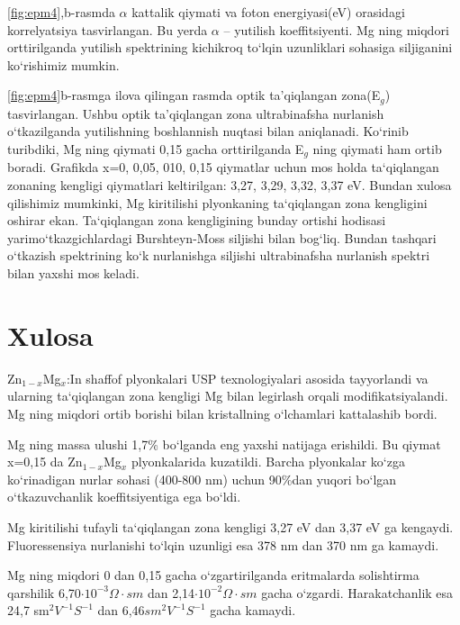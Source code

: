 \documentclass[14pt]{article}
\begin{document}
\ref{fig:epm4},b-rasmda $\alpha$ kattalik qiymati va foton energiyasi(eV) orasidagi korrelyatsiya tasvirlangan. Bu yerda $\alpha$ -- yutilish koeffitsiyenti. Mg ning miqdori orttirilganda yutilish spektrining kichikroq to`lqin uzunliklari sohasiga siljiganini ko`rishimiz mumkin.  

\ref{fig:epm4}b-rasmga ilova qilingan rasmda optik ta'qiqlangan zona(E$_{g}$) tasvirlangan. Ushbu optik ta'qiqlangan zona ultrabinafsha nurlanish o`tkazilganda yutilishning boshlannish nuqtasi bilan aniqlanadi. Ko`rinib turibdiki, Mg ning qiymati 0,15 gacha orttirilganda E$_{g}$ ning qiymati ham ortib boradi. Grafikda x=0, 0,05, 010, 0,15 qiymatlar uchun mos holda ta`qiqlangan zonaning kengligi qiymatlari keltirilgan: 3,27, 3,29, 3,32, 3,37 eV. Bundan xulosa qilishimiz mumkinki, Mg kiritilishi plyonkaning ta`qiqlangan zona kengligini oshirar ekan. Ta`qiqlangan zona kengligining bunday ortishi hodisasi yarimo`tkazgichlardagi  Burshteyn-Moss siljishi bilan bog`liq. Bundan tashqari o`tkazish spektrining ko`k nurlanishga siljishi ultrabinafsha nurlanish spektri bilan yaxshi mos keladi. 
	
	
	
	
	
	
	
	
	
	
	
	\newpage
	\section{Xulosa}
	\noindent	
	Zn$_{1-x}$Mg$_{x}$:In shaffof plyonkalari USP texnologiyalari asosida tayyorlandi va ularning ta`qiqlangan zona kengligi Mg bilan legirlash orqali modifikatsiyalandi. Mg ning miqdori ortib borishi bilan kristallning o`lchamlari kattalashib bordi.
	
	Mg ning massa ulushi 1,7\% bo`lganda eng yaxshi natijaga erishildi. Bu qiymat x=0,15 da Zn$_{1-x}$Mg$_{x}$ plyonkalarida kuzatildi. Barcha plyonkalar ko`zga ko`rinadigan nurlar sohasi (400-800 nm) uchun 90\%dan yuqori bo`lgan o`tkazuvchanlik koeffitsiyentiga ega bo`ldi.
	
	Mg kiritilishi tufayli ta`qiqlangan zona kengligi 3,27 eV dan 3,37 eV ga kengaydi. Fluoressensiya nurlanishi to`lqin uzunligi esa 378 nm dan 370 nm ga kamaydi. 
	
	Mg ning miqdori 0 dan 0,15 gacha o`zgartirilganda eritmalarda solishtirma qarshilik 6,70$\cdot 10^{-3}\Omega\cdot sm$ dan 2,14$\cdot 10^{-2}\Omega\cdot sm$ gacha o`zgardi. Harakatchanlik esa 24,7 sm$^{2}V^{-1}S^{-1}$ dan 6,46$sm^{2}V^{-1}S^{-1}$ gacha kamaydi. 
	
\end{document}
